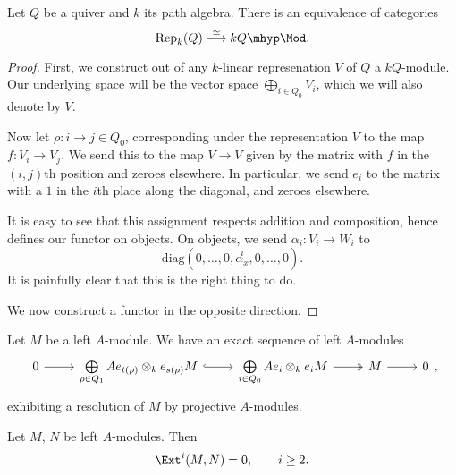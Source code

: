 \documentclass[main.tex]{subfiles}
\begin{document}
\begin{proposition}
  Let $Q$ be a quiver and $k$ its path algebra. There is an equivalence of categories
  \begin{equation*}
    \mathrm{Rep}_{k}(Q) \overset{\simeq}{\longrightarrow} kQ\mhyp\Mod.
  \end{equation*}
\end{proposition}
\begin{proof}
  First, we construct out of any $k$-linear represenation $V$ of $Q$ a $kQ$-module. Our underlying space will be the vector space $\bigoplus_{i \in Q_{0}} V_{i}$, which we will also denote by $V$.

  Now let $\rho\colon i \to j \in Q_{0}$, corresponding under the representation $V$ to the map $f\colon V_{i} \to V_{j}$. We send this to the map $V \to V$ given by the matrix with $f$ in the $(i, j)$th position and zeroes elsewhere. In particular, we send $e_{i}$ to the matrix with a $1$ in the $i$th place along the diagonal, and zeroes elsewhere.
  
  It is easy to see that this assignment respects addition and composition, hence defines our functor on objects. On objects, we send $\alpha_{i}\colon V_{i} \to W_{i}$ to
  \begin{equation*}
    \mathrm{diag}(0,\ldots, 0, \overset{i}{\alpha_{x}}, 0, \ldots, 0).
  \end{equation*}
  It is painfully clear that this is the right thing to do.

  We now construct a functor in the opposite direction.
\end{proof}

\begin{proposition}
  Let $M$ be a left $A$-module. We have an exact sequence of left $A$-modules
  \begin{equation*}
    \begin{tikzcd}
      0
      \arrow[r]
      & \bigoplus\limits_{\rho \in Q_{1}}Ae_{t(\rho)} \otimes_{k} e_{s(\rho)}M
      \arrow[r, hook]
      & \bigoplus\limits_{i \in Q_{0}}Ae_{i} \otimes_{k} e_{i}M
      \arrow[r, two heads]
      & M
      \arrow[r]
      & 0
    \end{tikzcd},
  \end{equation*}
  exhibiting a resolution of $M$ by projective $A$-modules.
\end{proposition}

\begin{corollary}
  Let $M$, $N$ be left $A$-modules. Then 
  \begin{equation*}
    \Ext^{i}(M, N) = 0,\qquad i \geq 2.
  \end{equation*}
\end{corollary}
\end{document}
